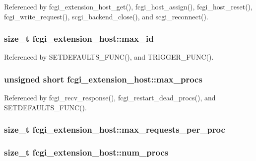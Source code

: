 Referenced by fcgi\-\_\-extension\-\_\-host\-\_\-get(), fcgi\-\_\-host\-\_\-assign(), fcgi\-\_\-host\-\_\-reset(), fcgi\-\_\-write\-\_\-request(), scgi\-\_\-backend\-\_\-close(), and scgi\-\_\-reconnect().

\hypertarget{structfcgi__extension__host_a9748fdf000b78644fa33b92c39006166}{
\subsubsection[{max\-\_\-id}]{\setlength{\rightskip}{0pt plus 5cm}size\-\_\-t fcgi\-\_\-extension\-\_\-host\-::max\-\_\-id}}\label{structfcgi__extension__host_a9748fdf000b78644fa33b92c39006166}


Referenced by S\-E\-T\-D\-E\-F\-A\-U\-L\-T\-S\-\_\-\-F\-U\-N\-C(), and T\-R\-I\-G\-G\-E\-R\-\_\-\-F\-U\-N\-C().

\hypertarget{structfcgi__extension__host_a223dbc6acf4f59361be6c6c644af12c0}{
\subsubsection[{max\-\_\-procs}]{\setlength{\rightskip}{0pt plus 5cm}unsigned short fcgi\-\_\-extension\-\_\-host\-::max\-\_\-procs}}\label{structfcgi__extension__host_a223dbc6acf4f59361be6c6c644af12c0}


Referenced by fcgi\-\_\-recv\-\_\-response(), fcgi\-\_\-restart\-\_\-dead\-\_\-procs(), and S\-E\-T\-D\-E\-F\-A\-U\-L\-T\-S\-\_\-\-F\-U\-N\-C().

\hypertarget{structfcgi__extension__host_af07d55d403b8d4b2f4cbab23ad5367c2}{
\subsubsection[{max\-\_\-requests\-\_\-per\-\_\-proc}]{\setlength{\rightskip}{0pt plus 5cm}size\-\_\-t fcgi\-\_\-extension\-\_\-host\-::max\-\_\-requests\-\_\-per\-\_\-proc}}\label{structfcgi__extension__host_af07d55d403b8d4b2f4cbab23ad5367c2}
\hypertarget{structfcgi__extension__host_aadeb7bc043c469f865c565ba35e2ca3c}{
\subsubsection[{num\-\_\-procs}]{\setlength{\rightskip}{0pt plus 5cm}size\-\_\-t fcgi\-\_\-extension\-\_\-host\-::num\-\_\-procs}}\label{structfcgi__extension__host_aadeb7bc043c469f865c565ba35e2ca3c}


